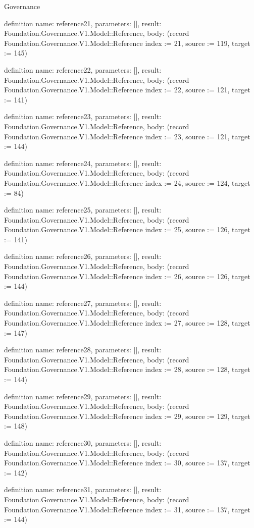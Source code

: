 \begin{lexlean}{Governance}
\begin{semanticmodule}
definition{
  name: reference21,
  parameters: [],
  result: Foundation.Governance.V1.Model::Reference,
  body: (record Foundation.Governance.V1.Model::Reference {index := 21, source := 119, target := 145})
}

definition{
  name: reference22,
  parameters: [],
  result: Foundation.Governance.V1.Model::Reference,
  body: (record Foundation.Governance.V1.Model::Reference {index := 22, source := 121, target := 141})
}

definition{
  name: reference23,
  parameters: [],
  result: Foundation.Governance.V1.Model::Reference,
  body: (record Foundation.Governance.V1.Model::Reference {index := 23, source := 121, target := 144})
}

definition{
  name: reference24,
  parameters: [],
  result: Foundation.Governance.V1.Model::Reference,
  body: (record Foundation.Governance.V1.Model::Reference {index := 24, source := 124, target := 84})
}

definition{
  name: reference25,
  parameters: [],
  result: Foundation.Governance.V1.Model::Reference,
  body: (record Foundation.Governance.V1.Model::Reference {index := 25, source := 126, target := 141})
}

definition{
  name: reference26,
  parameters: [],
  result: Foundation.Governance.V1.Model::Reference,
  body: (record Foundation.Governance.V1.Model::Reference {index := 26, source := 126, target := 144})
}

definition{
  name: reference27,
  parameters: [],
  result: Foundation.Governance.V1.Model::Reference,
  body: (record Foundation.Governance.V1.Model::Reference {index := 27, source := 128, target := 147})
}

definition{
  name: reference28,
  parameters: [],
  result: Foundation.Governance.V1.Model::Reference,
  body: (record Foundation.Governance.V1.Model::Reference {index := 28, source := 128, target := 144})
}

definition{
  name: reference29,
  parameters: [],
  result: Foundation.Governance.V1.Model::Reference,
  body: (record Foundation.Governance.V1.Model::Reference {index := 29, source := 129, target := 148})
}

definition{
  name: reference30,
  parameters: [],
  result: Foundation.Governance.V1.Model::Reference,
  body: (record Foundation.Governance.V1.Model::Reference {index := 30, source := 137, target := 142})
}

definition{
  name: reference31,
  parameters: [],
  result: Foundation.Governance.V1.Model::Reference,
  body: (record Foundation.Governance.V1.Model::Reference {index := 31, source := 137, target := 144})
}


\end{semanticmodule}
\end{lexlean}
